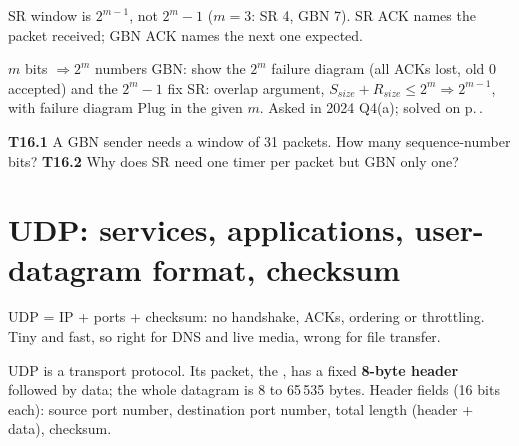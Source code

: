 \begin{warningbox}
SR window is $2^{m-1}$, not $2^m-1$ ($m=3$: SR 4, GBN 7). SR ACK names the packet received; GBN ACK names the next one expected.
\end{warningbox}

\begin{answerplan}
 $m$ bits $\Rightarrow 2^m$ numbers \quad {} GBN: show the $2^m$ failure diagram (all ACKs lost, old 0 accepted) and the $2^m-1$ fix \quad
{} SR: overlap argument, $S_{size}+R_{size}\le2^m \Rightarrow 2^{m-1}$, with failure diagram \quad {} Plug in the given $m$.
Asked in 2024 Q4(a); solved on p.\,\pageref{q:MS2024-4a}.
\par{} \textbf{T16.1} A GBN sender needs a window of 31 packets. How many sequence-number bits?\quad
\textbf{T16.2} Why does SR need one timer per packet but GBN only one?
\end{answerplan}

\section{UDP: services, applications, user-datagram format, checksum}\label{sec:T17}
  

\begin{intuitionbox}
UDP = IP + ports + checksum: no handshake, ACKs, ordering or throttling. Tiny and fast, so right for DNS and live media, wrong for file transfer.
\end{intuitionbox}

\begin{definitionbox}
UDP is a  transport protocol. Its packet, the , has a fixed
\textbf{8-byte header} followed by data; the whole datagram is 8 to 65\,535 bytes. Header fields (16 bits each): source port number,
destination port number, total length (header + data), checksum. 
\end{definitionbox}

